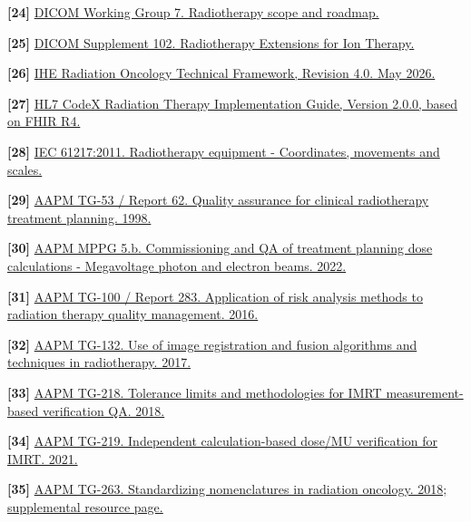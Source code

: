 \documentclass[11pt,letterpaper]{article}
\begin{document}
\textbf{[24] }\href{\detokenize{https://www.dicomstandard.org/activity/wgs/wg-07}}{DICOM Working Group 7. Radiotherapy scope and roadmap.}

\textbf{[25] }\href{\detokenize{https://www.dicomstandard.org/News-dir/ftsup/docs/sups/sup102.pdf}}{DICOM Supplement 102. Radiotherapy Extensions for Ion Therapy.}

\textbf{[26] }\href{\detokenize{https://profiles.ihe.net/RO/index.html}}{IHE Radiation Oncology Technical Framework, Revision 4.0. May 2026.}

\textbf{[27] }\href{\detokenize{https://hl7.org/fhir/us/codex-radiation-therapy/}}{HL7 CodeX Radiation Therapy Implementation Guide, Version 2.0.0, based on FHIR R4.}

\textbf{[28] }\href{\detokenize{https://webstore.iec.ch/en/publication/4929}}{IEC 61217:2011. Radiotherapy equipment - Coordinates, movements and scales.}

\textbf{[29] }\href{\detokenize{https://www.aapm.org/pubs/reports/detail.asp?docid=61}}{AAPM TG-53 \slash\allowbreak{} Report 62. Quality assurance for clinical radiotherapy treatment planning. 1998.}

\textbf{[30] }\href{\detokenize{https://www.aapm.org/pubs/mppg/detail.asp?docid=246}}{AAPM MPPG 5.b. Commissioning and QA of treatment planning dose calculations - Megavoltage photon and electron beams. 2022.}

\textbf{[31] }\href{\detokenize{https://aapm.org/pubs/reports/detail.asp?docid=156}}{AAPM TG-100 \slash\allowbreak{} Report 283. Application of risk analysis methods to radiation therapy quality management. 2016.}

\textbf{[32] }\href{\detokenize{https://www.aapm.org/pubs/reports/detail.asp?docid=164}}{AAPM TG-132. Use of image registration and fusion algorithms and techniques in radiotherapy. 2017.}

\textbf{[33] }\href{\detokenize{https://www.aapm.org/pubs/reports/detail.asp?docid=173}}{AAPM TG-218. Tolerance limits and methodologies for IMRT measurement-based verification QA. 2018.}

\textbf{[34] }\href{\detokenize{https://aapm.org/pubs/reports/detail.asp?docid=218}}{AAPM TG-219. Independent calculation-based dose\slash\allowbreak{}MU verification for IMRT. 2021.}

\textbf{[35] }\href{\detokenize{https://www.aapm.org/pubs/reports/rpt_263_supplemental/}}{AAPM TG-263. Standardizing nomenclatures in radiation oncology. 2018; supplemental resource page.}
\end{document}
